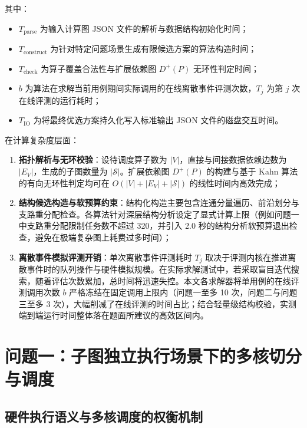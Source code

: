 \documentclass[anonymous,notoc]{gmcm2026}
\providecommand{\tightlist}{\setlength{\itemsep}{0pt}\setlength{\parskip}{0pt}}
\begin{document}
其中：

\begin{itemize}
\tightlist
\item
  \(T_{\mathrm{parse}}\) 为输入计算图 JSON 文件的解析与数据结构初始化时间；
\item
  \(T_{\mathrm{construct}}\) 为针对特定问题场景生成有限候选方案的算法构造时间；
\item
  \(T_{\mathrm{check}}\) 为算子覆盖合法性与扩展依赖图 \(D^+(P)\) 无环性判定时间；
\item
  \(b\) 为算法在求解当前用例期间实际调用的在线离散事件评测次数，\(T_j\) 为第 \(j\) 次在线评测的运行耗时；
\item
  \(T_{\mathrm{IO}}\) 为将最终优选方案持久化写入标准输出 JSON 文件的磁盘交互时间。
\end{itemize}

在计算复杂度层面：

\begin{enumerate}
\def\labelenumi{\arabic{enumi}.}
\tightlist
\item
  \textbf{拓扑解析与无环校验}：设待调度算子数为 \(|V|\)，直接与间接数据依赖边数为 \(|E_V|\)，生成的子图数量为 \(|\mathcal{S}|\)。扩展依赖图 \(D^+(P)\) 的构建与基于 Kahn 算法的有向无环性判定均可在 \(O(|V| + |E_V| + |\mathcal{S}|)\) 的线性时间内高效完成；
\item
  \textbf{结构候选构造与软预算约束}：结构化构造主要包含连通分量遍历、前沿划分与支路重分配检查。各算法针对深层结构分析设定了显式计算上限（例如问题一中支路重分配限制任务数不超过 320，并引入 2.0 秒的结构分析软预算退出检查，避免在极端复杂图上耗费过多时间）；
\item
  \textbf{离散事件模拟评测开销}：单次离散事件评测耗时 \(T_j\) 取决于评测内核在推进离散事件时的队列操作与硬件模拟规模。在实际求解测试中，若采取盲目迭代搜索，随着评估次数累加，总时间将迅速失控。本文各求解器将单用例的在线评测调用次数 \(b\) 严格冻结在固定调用上限内（问题一至多 10 次，问题二与问题三至多 3 次），大幅削减了在线评测的时间占比；结合轻量级结构校验，实测端到端运行时间整体落在题面所建议的高效区间内。
\end{enumerate}


\section{问题一：子图独立执行场景下的多核切分与调度}

\subsection{硬件执行语义与多核调度的权衡机制}
\end{document}
